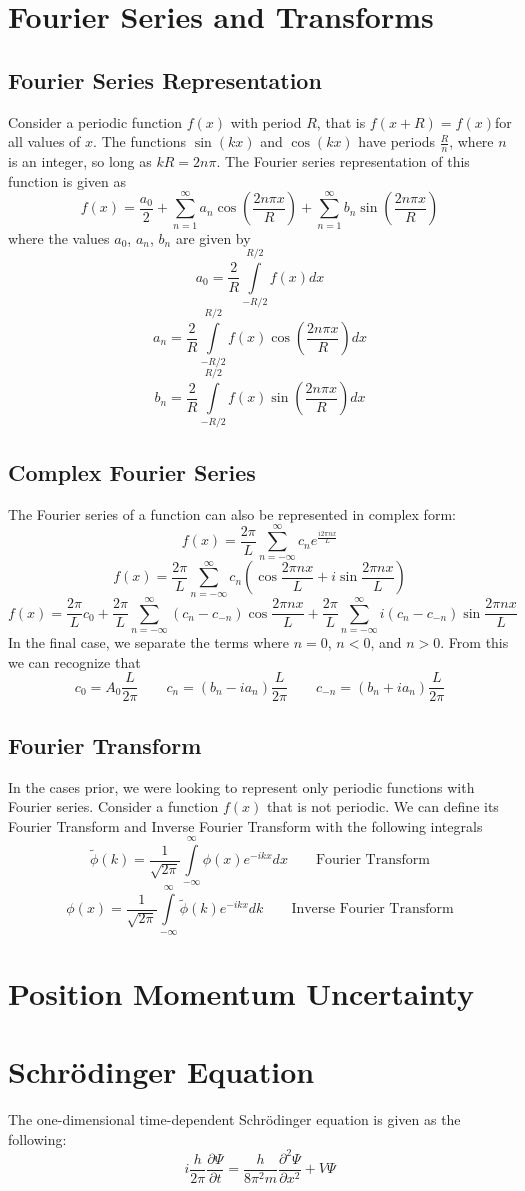 \documentclass[11pt]{article}
\begin{document}
\section{Fourier Series and Transforms}
\subsection{Fourier Series Representation}
Consider a periodic function $f (x)$ with period $R$, that is $f (x + R) = f (x) $for all values of $x$. The functions $\sin(kx)$ and $\cos(kx)$ have periods $\frac{R}{n}$, where $n$ is an integer, so long as $kR = 2n\pi$. The Fourier series representation of this function is given as
$$ f(x) = \frac{a_0}{2} + \sum_{n=1}^{\infty} a_n \cos \left( \frac{2n\pi x}{R}\right) + \sum_{n=1}^{\infty} b_n \sin \left( \frac{2n\pi x}{R}\right)$$
where the values $a_0$, $a_n$, $b_n$ are given by
$$ a_0 = \frac{2}{R} \int \limits_{-R/2}^{R/2} f(x)  dx$$
$$ a_n = \frac{2}{R} \int \limits_{-R/2}^{R/2} f(x) \cos \left( \frac{2n\pi x}{R}\right) dx$$
$$ b_n = \frac{2}{R} \int \limits_{-R/2}^{R/2} f(x) \sin \left( \frac{2n\pi x}{R}\right) dx$$
\subsection{Complex Fourier Series}
The Fourier series of a function can also be represented in complex form:
$$f(x) = \frac{2\pi}{L} \sum_{n=-\infty}^{\infty} c_n e^{\frac{i2\pi n x}{L}}$$
$$f(x) = \frac{2\pi}{L} \sum_{n=-\infty}^{\infty} c_n \left( \cos \frac{2\pi n x}{L} + i \sin \frac{2\pi n x}{L}\right)$$
$$f(x) = \frac{2\pi}{L} c_0 + \frac{2\pi}{L} \sum_{n=-\infty}^{\infty} (c_n - c_{-n})  \cos \frac{2\pi n x}{L} + \frac{2\pi}{L} \sum_{n=-\infty}^{\infty} i (c_n - c_{-n}) \sin \frac{2\pi n x}{L}$$
In the final case, we separate the terms where $n=0$, $n < 0$, and $n > 0$. From this we can recognize that
$$ c_0 = A_0 \frac{L}{2\pi} \quad \quad c_n = (b_n - ia_n) \frac{L}{2\pi} \quad \quad c_{-n} = (b_n + ia_n) \frac{L}{2\pi} $$
\subsection{Fourier Transform}
In the cases prior, we were looking to represent only periodic functions with Fourier series. Consider a function $f(x)$ that is not periodic. We can define its Fourier Transform and Inverse Fourier Transform with the following integrals
$$ \tilde{\phi} (k) = \frac{1}{\sqrt{2\pi}} \int \limits_{-\infty}^{\infty} \phi(x) e^{-ikx} dx \quad \quad  \text{Fourier Transform} $$
$$ {\phi} (x) = \frac{1}{\sqrt{2\pi}} \int \limits_{-\infty}^{\infty} \tilde{\phi} (k) e^{-ikx} dk\quad \quad  \text{Inverse Fourier Transform} $$
\section{Position Momentum Uncertainty}

\section{Schrödinger Equation}
The one-dimensional time-dependent Schrödinger equation is given as the following:
$$i\frac{h}{2\pi} \frac{\partial \Psi}{\partial t} = \frac{h}{8\pi^2m} \frac{\partial^2 \Psi}{\partial x^2} + V\Psi $$
\end{document}
